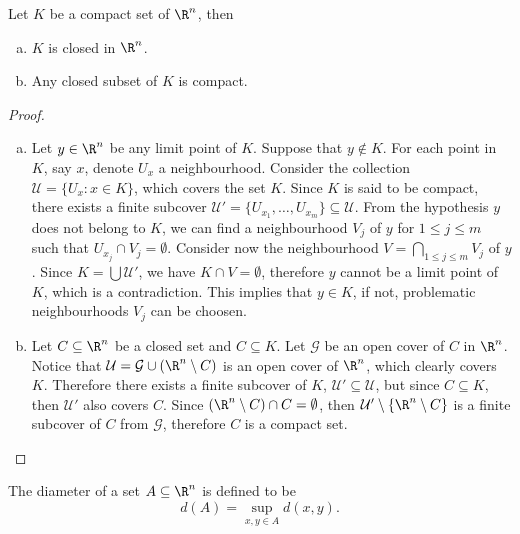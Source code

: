 \begin{proposition}\label{prop: compact-close}
Let \(K\) be a compact set of \(\R^n\), then
\begin{enumerate}[(a)]
\item \(K\) is closed in \(\R^n\).
\item Any closed subset of \(K\) is compact.
\end{enumerate}
\end{proposition}

\begin{proof}
\begin{enumerate}[(a)]
\item Let \(y \in \R^n\) be any limit point of \(K\). Suppose that \(y
    \not\in K\). For each point in \(K\), say \(x\), denote \(U_x\) a
    neighbourhood. Consider the collection \(\mathcal U = \{U_x \colon x \in K\}\),
    which covers the set \(K\). Since \(K\) is said to be compact, there
    exists a finite subcover \(\mathcal U' = \{U_{x_1}, \dots, U_{x_m}\}
    \subseteq \mathcal U\). From the hypothesis \(y\) does not belong to
    \(K\), we can find a neighbourhood \(V_j\) of \(y\) for \(1 \leq j \leq
    m\) such that \(U_{x_j} \cap V_j = \emptyset\). Consider now the
    neighbourhood \(V = \bigcap_{1 \leq j \leq m} V_j\) of \(y\). Since \(K =
    \bigcup \mathcal U'\), we have \(K \cap V = \emptyset\), therefore \(y\)
    cannot be a limit point of \(K\), which is a contradiction. This implies
    that \(y \in K\), if not, problematic neighbourhoods \(V_j\) can be
    choosen.
\item Let \(C \subseteq \R^n\) be a closed set and \(C \subseteq K\). Let
    \(\mathcal G\) be an open cover of \(C\) in \(\R^n\). Notice that
    \(\mathcal U = \mathcal G \cup (\R^n \setminus C)\) is an open cover of
    \(\R^n\), which clearly covers \(K\). Therefore there exists a finite
    subcover of \(K\), \(\mathcal U' \subseteq \mathcal U\), but since \(C
    \subseteq K\), then \(\mathcal U'\) also covers \(C\). Since \((\R^n
    \setminus C) \cap C = \emptyset\), then \(\mathcal U' \setminus \{\R^n
    \setminus C\}\) is a finite subcover of \(C\) from \(\mathcal G\),
    therefore \(C\) is a compact set.
\end{enumerate}
\end{proof}

\begin{definition}\label{def:Rn-diameter}
The diameter of a set \(A \subseteq \R^n\) is defined to be
\[
d(A) = \sup_{x, y \in A} d(x, y).
\]
\end{definition}

